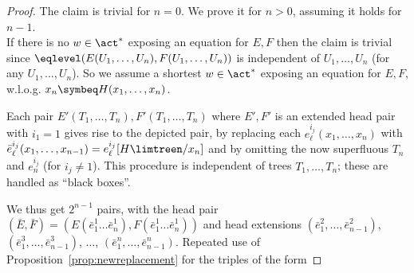 \documentclass[12pt]{article}
\begin{document}
\begin{proof}
The claim is trivial for $n=0$. We prove it for $n > 0$, assuming
it holds for $n{-}1$.
\\
If  there is no $w\in\act^*$ exposing an equation 
for $E,F$ then the claim is trivial since
$\eqlevel(E(U_1,\dots,U_n),F(U_1,\dots,U_n))$
is independent of 
$U_1,\dots,U_n$ (for any $U_1,\dots,U_n$). 
So we assume
a shortest $w\in\act^*$ exposing an equation 
for $E,F$, w.l.o.g. 
$x_n\symbeq H(x_1,\dots,x_n)$.

\medskip

\noindent
\begin{minipage}{0.6\textwidth}
Each pair $E'(T_1,\dots,T_n), F'(T_1,\dots,T_n)$ 
where $E',F'$ is an extended head pair with 
$i_1=1$
gives rise to
the depicted pair, by replacing
each $e^{i_j}_{\ell}(x_1,\dots,x_n)$ 
with 
$\bar{e}^{i_j}_{\ell}(x_1,\dots,x_{n-1})=
{e}^{i_j}_{\ell}[H\limtreen/x_n]$
and by omitting the now superfluous 
$T_n$ and $e^{i_j}_n$ (for $i_j\neq 1$). This procedure is independent
of trees $T_1,\dots,T_n$; these are handled as ``black boxes''.
\end{minipage}
\begin{minipage}{0.4\textwidth}
\begin{center}
\end{center}
\end{minipage}

\medskip

\noindent
We thus get $2^{n-1}$ pairs, with the head pair 
$(\bar{E},\bar{F})=
(E(\bar{e}^{1}_1 \dots \bar{e}^{1}_n),
F(\bar{e}^{1}_1 \dots \bar{e}^{1}_n))$ and head extensions
$(\bar{e}^{2}_1, \dots, \bar{e}^{2}_{n-1})$, 
$(\bar{e}^{3}_1, \dots, \bar{e}^{3}_{n-1})$, 
$\dots$,
$(\bar{e}^{n}_1, \dots, \bar{e}^{n}_{n-1})$.
Repeated use of Proposition~\ref{prop:newreplacement}
for the triples of the form 


\end{proof}
\end{document}
